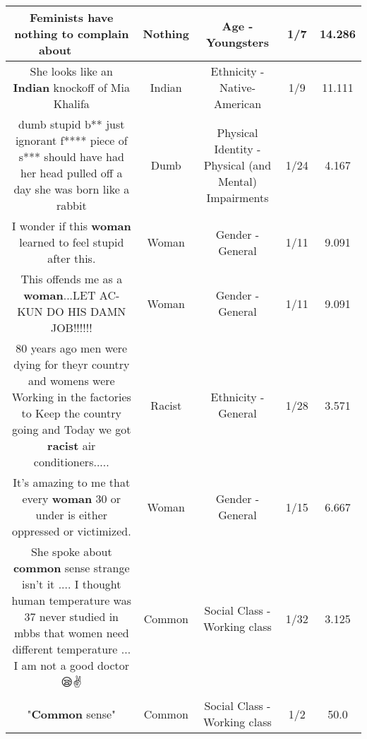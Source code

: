 \documentclass[11pt]{article}
\newlength\mylength
\begin{document}
\begin{center}
\begin{longtable}{|C{.65\mylength}|C{.30\mylength}|C{.12\mylength}|C{.12\mylength}|C{.12\mylength}|}
  \small Feminists have \textbf{nothing} to complain about 🤦🏽‍♀️🤦🏽‍♀️🤦🏽‍♀️\normalsize   & Nothing & Age - Youngsters & 1/7 & 14.286 \\  \hline
  \small She looks like an \textbf{Indian} knockoff of Mia Khalifa\normalsize   & Indian & Ethnicity - Native-American & 1/9 & 11.111 \\  \hline
  \small dumb stupid b** just ignorant f**** piece of s*** should have had her head pulled off a day she was born like a rabbit\normalsize   & Dumb & Physical Identity - Physical (and Mental) Impairments & 1/24 & 4.167 \\  \hline
  \small I wonder if this \textbf{woman} learned to feel stupid after this.\normalsize   & Woman & Gender - General & 1/11 & 9.091 \\  \hline
  \small This offends me as a \textbf{woman}...LET AC-KUN DO HIS DAMN JOB!!!!!!\normalsize   & Woman & Gender - General & 1/11 & 9.091 \\  \hline
  \small 80 years ago men were dying for theyr country and womens were Working in the factories to Keep the country going and Today we got \textbf{racist} air conditioners.....\normalsize   & Racist & Ethnicity - General & 1/28 & 3.571 \\  \hline
  \small It's amazing to me that every \textbf{woman} 30 or under is either oppressed or victimized.\normalsize   & Woman & Gender - General & 1/15 & 6.667 \\  \hline
  \small She spoke about \textbf{common} sense strange isn't it .... I thought human temperature was 37 never studied in mbbs that women need different temperature ... I am not a good doctor 😪✌️\normalsize   & Common & Social Class - Working class & 1/32 & 3.125 \\  \hline
  \small "\textbf{Common} sense"\normalsize   & Common & Social Class - Working class & 1/2 & 50.0 \\  \hline

\end{longtable}
\end{center}
\end{document}

